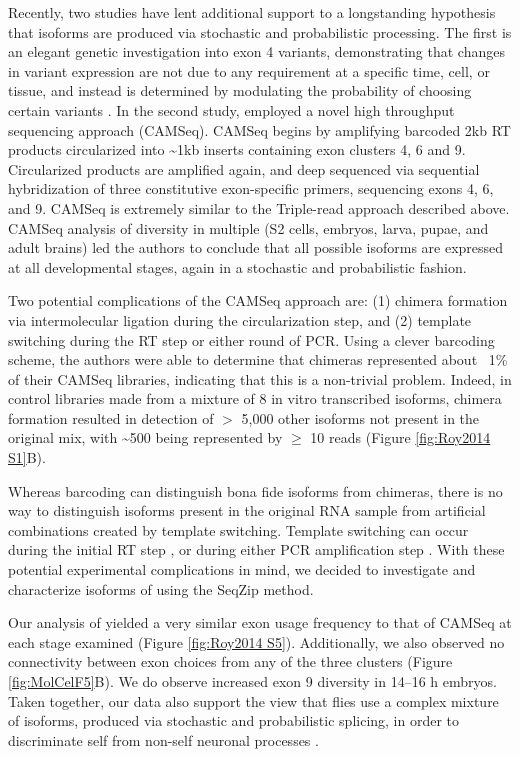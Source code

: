 {		Recently, two studies have lent additional support to a longstanding hypothesis that \dscam{} isoforms are produced via stochastic and probabilistic processing. The first is an elegant genetic investigation into exon 4 variants, demonstrating that changes in variant expression are not due to any requirement at a specific time, cell, or tissue, and instead is determined by modulating the probability of choosing certain variants \citep{Miura2013b}. In the second study, \citet{Sun2013} employed a novel high throughput sequencing approach (CAMSeq). CAMSeq begins by amplifying barcoded 2kb \dscam{} RT products circularized into \textasciitilde 1kb inserts containing exon clusters 4, 6 and 9. Circularized products are amplified again, and deep sequenced via sequential hybridization of three constitutive exon-specific primers, sequencing exons 4, 6, and 9. CAMSeq is extremely similar to the Triple-read approach described above. CAMSeq analysis of \dscam{} diversity in multiple \flies{} (S2 cells, embryos, larva, pupae, and adult brains) led the authors to conclude that all possible isoforms are expressed at all developmental stages, again in a stochastic and probabilistic fashion.

		Two potential complications of the CAMSeq approach are: (1) chimera formation via intermolecular ligation during the circularization step, and (2) template switching during the RT step or either round of PCR. Using a clever barcoding scheme, the authors were able to determine that chimeras represented about ~1\% of their CAMSeq libraries, indicating that this is a non-trivial problem. Indeed, in control libraries made from a mixture of 8 in vitro transcribed \dscam{} isoforms, chimera formation resulted in detection of $>$ 5,000 other isoforms not present in the original mix, with \textasciitilde 500 being represented by $\ge$ 10 reads (Figure \ref{fig:Roy2014 S1}B).

		Whereas barcoding can distinguish bona fide isoforms from chimeras, there is no way to distinguish isoforms present in the original RNA sample from artificial combinations created by template switching. Template switching can occur during the initial RT step \citep{Houseley2010a}, or during either PCR amplification step \citep{Meyerhans1990a,Judo1998}. With these potential experimental complications in mind, we decided to investigate and characterize isoforms of \dscam{} using the SeqZip method.

		Our analysis of \dscam{} yielded a very similar exon usage frequency to that of CAMSeq at each stage examined (Figure \ref{fig:Roy2014 S5}). Additionally, we also observed no connectivity between exon choices from any of the three clusters (Figure \ref{fig:MolCelF5}B). We do observe increased exon 9 diversity in 14–16 h embryos. Taken together, our data also support the view that flies use a complex mixture of \dscam{} isoforms, produced via stochastic and probabilistic splicing, in order to discriminate self from non-self neuronal processes \citep{LawrenceZipursky2013}.

}
